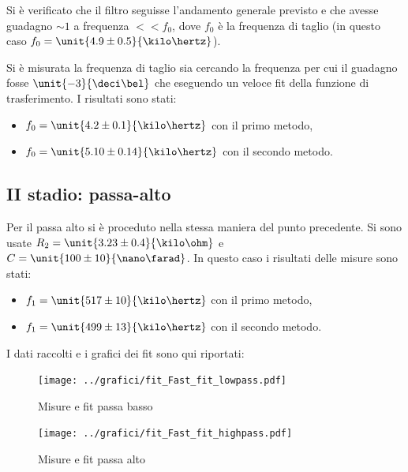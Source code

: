 \documentclass[10pt,a4paper]{article}
\begin{document}
Si è verificato che il filtro seguisse l'andamento generale previsto e che avesse guadagno $\sim 1$ a frequenza $<<f_0$, dove $f_0$ è la frequenza di taglio (in questo caso $f_0 = \unit{4.9 \pm 0.5}{\kilo\hertz}$).

Si è misurata la frequenza di taglio sia cercando la frequenza per cui il guadagno fosse $\unit{-3}{\deci\bel}$ che eseguendo un veloce fit della funzione di trasferimento.
I risultati sono stati:
\begin{itemize}
	\item $f_0 = \unit{4.2 \pm 0.1}{\kilo\hertz}$ con il primo metodo, %
	\item $f_0 = \unit{5.10 \pm 0.14}{\kilo\hertz}$ con il secondo metodo.
\end{itemize}

\subsection{II stadio: passa-alto}
Per il passa alto si è proceduto nella stessa maniera del punto precedente. Si sono usate $R_2=\unit{3.23 \pm 0.4}{\kilo\ohm}$ e $C=\unit{100 \pm 10}{\nano\farad}$.
In questo caso i risultati delle misure sono stati:
\begin{itemize}
	\item $f_1 = \unit{517 \pm 10}{\kilo\hertz}$ con il primo metodo,
	\item $f_1 = \unit{499 \pm 13}{\kilo\hertz}$ con il secondo metodo.
\end{itemize}

I dati raccolti e i grafici dei fit sono qui riportati:

\begin{figure}[h!]
	\centering
	\begin{minipage}[c]{0.49\textwidth}
		\resizebox{\textwidth}{!}{
			}
	\end{minipage}
\begin{minipage}[c]{0.49\textwidth}
	\resizebox{\textwidth}{!}{
		}
\end{minipage}
\end{figure}

\begin{figure}[h!]
	\centering
	\begin{minipage}[c]{0.5\textwidth}
		\centering
		\texttt{[image: ../grafici/fit\_Fast\_fit\_lowpass.pdf]}
		\caption{Misure e fit passa basso}
	\end{minipage}%
	\begin{minipage}[c]{0.5\textwidth}
		\centering
		\texttt{[image: ../grafici/fit\_Fast\_fit\_highpass.pdf]}
		\caption{Misure e fit passa alto}
	\end{minipage}
\end{figure}
\end{document}
